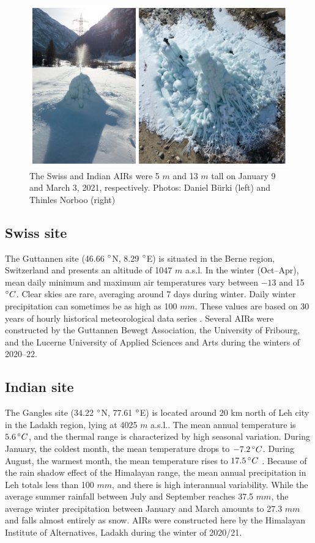 \begin{figure}[htb]
	\centering
	\includegraphics[width=12 cm]{figs/2AIRs.jpg}
	\caption{The Swiss and Indian \ac{AIRs} were 5 $m$ and 13 $m$ tall on January 9 and March 3, 2021,
    respectively. Photos: Daniel Bürki (left) and Thinles Norboo (right)}
	\label{fig:2AIRs}
\end{figure}

\subsection{Swiss site}

The Guttannen site (46.66 $^{\circ}$N, 8.29 $^{\circ}$E) is situated in the Berne region, Switzerland and presents an
altitude of 1047 $m$ a.s.l. In the winter (Oct–Apr), mean daily minimum and maximum air temperatures vary
between $-13$ and 15 $^{\circ} C$. Clear skies are rare, averaging around 7 days during winter. Daily winter
precipitation can sometimes be as high as 100 $mm$. These values are based on 30 years of hourly historical
meteorological data series \citep{meteoblueClimateGuttannen2021}. Several \ac{AIRs} were constructed by the Guttannen
Bewegt Association, the University of Fribourg, and the Lucerne University of Applied Sciences and Arts during
the winters of 2020–22.

\subsection{Indian site}

The Gangles site (34.22 $^{\circ}$N, 77.61 $^{\circ}$E) is located around 20 km north of Leh city in the Ladakh
region, lying at 4025 $m$ a.s.l.. The mean annual temperature is $5.6 \, ^{\circ} C$, and the thermal range is
characterized by high seasonal variation. During January, the coldest month, the mean temperature drops to $-7.2
	\, ^{\circ} C$. During August, the warmest month, the mean temperature rises to $17.5 \, ^{\circ} C$
\citep{nusserIrrigationDevelopmentUpper2012}. Because of the rain shadow effect of the Himalayan range, the mean
annual precipitation in Leh totals less than 100 $mm$, and there is high interannual variability. While the
average summer rainfall between July and September reaches 37.5 $mm$, the average winter precipitation between
January and March amounts to 27.3 $ mm$ and falls almost entirely as snow. \ac{AIRs} were constructed here by the
Himalayan Institute of Alternatives, Ladakh during the winter of 2020/21.

